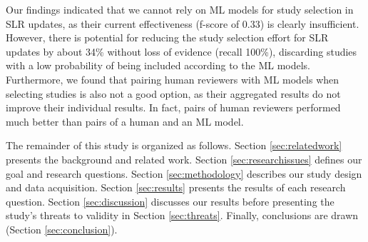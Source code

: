 Our findings indicated that we cannot rely on ML models for study selection in SLR updates, as their current effectiveness (f-score of 0.33) is clearly insufficient. However, there is potential for reducing the study selection effort for SLR updates by about 34\% without loss of evidence (recall 100\%), discarding studies with a low probability of being included according to the ML models. Furthermore, we found that pairing human reviewers with ML models when selecting studies is also not a good option, as their aggregated results do not improve their individual results. In fact, pairs of human reviewers performed much better than pairs of a human and an ML model.

The remainder of this study is organized as follows. Section \ref{sec:relatedwork} presents the background and related work. Section \ref{sec:researchissues} defines our goal and research questions. Section \ref{sec:methodology} describes our study design and data acquisition. Section \ref{sec:results} presents the results of each research question. Section \ref{sec:discussion} discusses our results before presenting the study's threats to validity in Section \ref{sec:threats}. Finally, conclusions are drawn (Section \ref{sec:conclusion}).